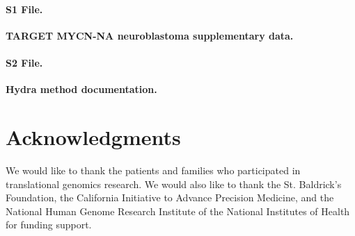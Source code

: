 \documentclass[10pt,letterpaper]{article}
\begin{document}
\paragraph*{S1 File.}
\label{S1_File}
{\bf TARGET MYCN-NA neuroblastoma supplementary data.}

\paragraph*{S2 File.}
\label{S2_File}
{\bf Hydra method documentation.}




\section*{Acknowledgments}
We would like to thank the patients and families who participated in translational genomics research. We would also like to thank the St. Baldrick's Foundation, the California Initiative to Advance Precision Medicine, and the National Human Genome Research Institute of the National Institutes of Health for funding support.

\nolinenumbers

%
%
%
\end{document}
